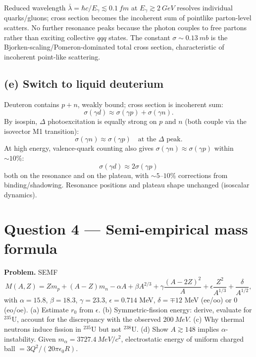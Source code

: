 \documentclass[11pt]{article}
\begin{document}
Reduced wavelength $\bar\lambda=\hbar c/E_\gamma\lesssim \SI{0.1}{fm}$ at $E_\gamma\gtrsim\SI{2}{GeV}$ resolves individual quarks/gluons; cross section becomes the incoherent sum of pointlike parton-level scatters. No further resonance peaks because the photon couples to free partons rather than exciting collective $qqq$ states. The constant $\sigma\sim\SI{0.13}{mb}$ is the Bjorken-scaling/Pomeron-dominated total cross section, characteristic of incoherent point-like scattering.

\subsection*{(e) Switch to liquid deuterium}

Deuteron contains $p+n$, weakly bound; cross section is incoherent sum:
\[
\sigma(\gamma d)\approx\sigma(\gamma p)+\sigma(\gamma n).
\]
By isospin, $\Delta$ photoexcitation is equally strong on $p$ and $n$ (both couple via the isovector M1 transition):
\[
\sigma(\gamma n)\approx \sigma(\gamma p)\quad\text{at the }\Delta\text{ peak}.
\]
At high energy, valence-quark counting also gives $\sigma(\gamma n)\approx\sigma(\gamma p)$ within $\sim 10\%$:
\begin{equation}
\boxed{\;\sigma(\gamma d)\approx 2\sigma(\gamma p)\;}
\label{eq:gammad}
\end{equation}
both on the resonance and on the plateau, with $\sim 5$--$10\%$ corrections from binding/shadowing. Resonance positions and plateau shape unchanged (isoscalar dynamics).

\section*{Question 4 --- Semi-empirical mass formula}

\textbf{Problem.} SEMF
\[
M(A,Z)=Zm_p+(A-Z)m_n-\alpha A+\beta A^{2/3}+\gamma\frac{(A-2Z)^{2}}{A}+\epsilon\frac{Z^{2}}{A^{1/3}}+\frac{\delta}{A^{1/2}},
\]
with $\alpha=15.8$, $\beta=18.3$, $\gamma=23.3$, $\epsilon=0.714$ MeV, $\delta=\mp 12$ MeV (ee/oo) or $0$ (eo/oe). (a) Estimate $r_0$ from $\epsilon$. (b) Symmetric-fission energy: derive, evaluate for $^{235}$U, account for the discrepancy with the observed $\SI{200}{MeV}$. (c) Why thermal neutrons induce fission in $^{235}$U but not $^{238}$U. (d) Show $A\gtrsim 148$ implies $\alpha$-instability. Given $m_\alpha=\SI{3727.4}{MeV}/c^{2}$, electrostatic energy of uniform charged ball $=3Q^{2}/(20\pi\epsilon_0 R)$.
\end{document}

